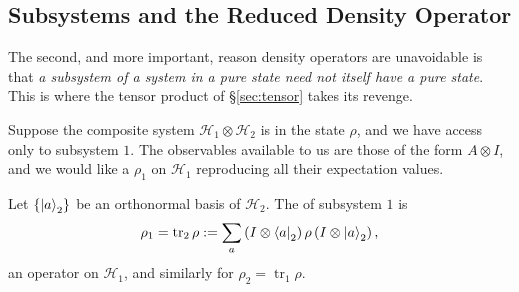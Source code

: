 \documentclass[a4paper]{scrartcl}
\newcommand{\ptr}[1]{\operatorname{tr}_{#1}}
\begin{document}
\begin{center}
\end{center}

\subsection{Subsystems and the Reduced Density Operator}

The second, and more important, reason density operators are unavoidable is that \emph{a subsystem of a system in a pure state need not itself have a pure state}. This is where the tensor product of \S\ref{sec:tensor} takes its revenge.

Suppose the composite system $\mathcal{H}_1\otimes\mathcal{H}_2$ is in the state $\rho$, and we have access only to subsystem $1$. The observables available to us are those of the form $A \otimes I$, and we would like a $\rho_1$ on $\mathcal{H}_1$ reproducing all their expectation values.

\begin{definition}
    Let $\{\ket{a}_2\}$ be an orthonormal basis of $\mathcal{H}_2$. The  of subsystem $1$ is
    $$
    \rho_1 = \ptr{2}\rho := \sum_a \left( I \otimes \bra{a}_2 \right)\rho\left( I \otimes \ket{a}_2 \right),
    $$
    an operator on $\mathcal{H}_1$, and similarly for $\rho_2 = \ptr{1}\rho$.
\end{definition}
\end{document}
